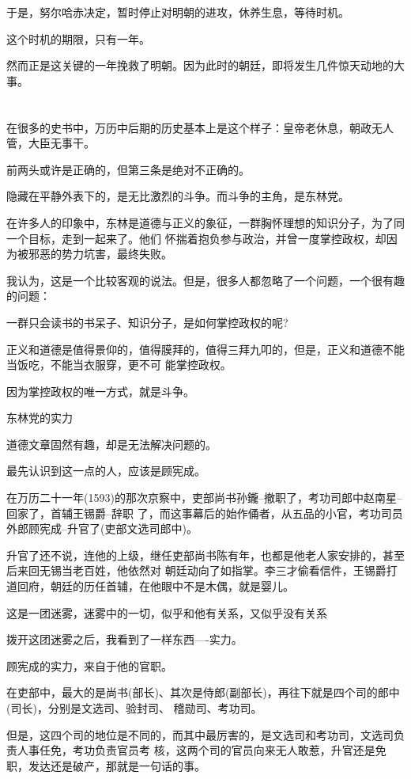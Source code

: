 \documentclass[11pt,a4paper,onecolumn]{article}
\begin{document}
于是，努尔哈赤决定，暂时停止对明朝的进攻，休养生息，等待时机。

这个时机的期限，只有一年。

然而正是这关键的一年挽救了明朝。因为此时的朝廷，即将发生几件惊天动地的大事。

\section[\thesection]{}

在很多的史书中，万历中后期的历史基本上是这个样子：皇帝老休息，朝政无人管，大臣无事干。

前两头或许是正确的，但第三条是绝对不正确的。

隐藏在平静外表下的，是无比激烈的斗争。而斗争的主角，是东林党。

在许多人的印象中，东林是道德与正义的象征，一群胸怀理想的知识分子，为了同一个目标，走到一起来了。他们
怀揣着抱负参与政治，并曾一度掌控政权，却因为被邪恶的势力坑害，最终失败。

我认为，这是一个比较客观的说法。但是，很多人都忽略了一个问题，一个很有趣的问题：

一群只会读书的书呆子、知识分子，是如何掌控政权的呢?

正义和道德是值得景仰的，值得膜拜的，值得三拜九叩的，但是，正义和道德不能当饭吃，不能当衣服穿，更不可
能掌控政权。

因为掌控政权的唯一方式，就是斗争。

东林党的实力

道德文章固然有趣，却是无法解决问题的。

最先认识到这一点的人，应该是顾宪成。

在万历二十一年(1593)的那次京察中，吏部尚书孙鑨--撤职了，考功司郎中赵南星--回家了，首辅王锡爵--辞职
了，而这事幕后的始作俑者，从五品的小官，考功司员外郎顾宪成--升官了(吏部文选司郎中)。

升官了还不说，连他的上级，继任吏部尚书陈有年，也都是他老人家安排的，甚至后来回无锡当老百姓，他依然对
朝廷动向了如指掌。李三才偷看信件，王锡爵打道回府，朝廷的历任首辅，在他眼中不是木偶，就是婴儿。

这是一团迷雾，迷雾中的一切，似乎和他有关系，又似乎没有关系

拨开这团迷雾之后，我看到了一样东西----实力。

顾宪成的实力，来自于他的官职。

在吏部中，最大的是尚书(部长)、其次是侍郎(副部长)，再往下就是四个司的郎中(司长)，分别是文选司、验封司、
稽勋司、考功司。

但是，这四个司的地位是不同的，而其中最厉害的，是文选司和考功司，文选司负责人事任免，考功负责官员考
核，这两个司的官员向来无人敢惹，升官还是免职，发达还是破产，那就是一句话的事。
\end{document}

